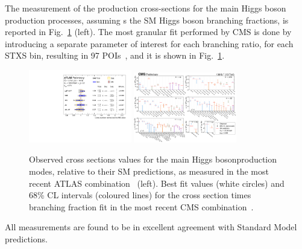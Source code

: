 \documentclass[a4paper,11pt]{article}
\begin{document}
The measurement of the production cross-sections for the main Higgs
boson production processes, assuming s the SM Higgs boson branching
fractions, is reported in Fig.~\ref{fig:stxs} (left). The most
granular fit performed by CMS is done by introducing a separate
parameter of interest for each branching ratio, for each STXS bin,
resulting in 97 POIs~\cite{cms-comb}, and it is shown in
Fig.~\ref{fig:stxs}.

\begin{figure}[!tbp]
\centering
\includegraphics[width=0.4\textwidth]{stxs-atlas-xsecs}
\includegraphics[width=0.4\textwidth]{stxs-cms-xsecs}
\caption
{Observed cross sections values for the main Higgs bosonproduction
  modes, relative to their SM predictions, as measured in the most
  recent ATLAS combination~\cite{atlas-comb} (left). Best fit values
  (white circles) and 68\% CL intervals (coloured lines) for the cross
  section times branching fraction fit in the most recent CMS
  combination~\cite{cms-comb}.
\label{fig:stxs}
}
\end{figure}

All measurements are found to be in excellent agreement with Standard Model predictions.







\end{document}
